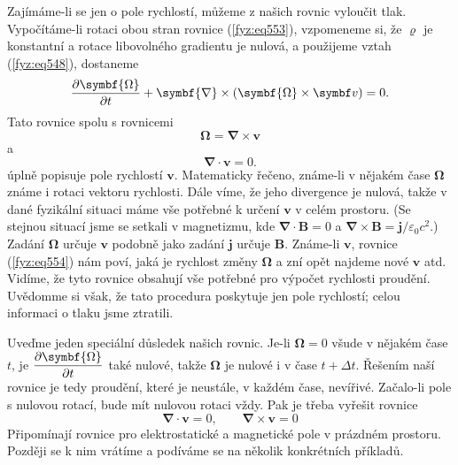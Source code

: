 {    Zajímáme-li se jen o pole rychlostí, můžeme z našich rovnic vyloučit tlak. Vypočítáme-li rotaci 
    obou stran rovnice (\ref{fyz:eq553}), vzpomeneme si, že \(\varrho\) je konstantní a rotace 
    libovolného gradientu je nulová, a použijeme vztah (\ref{fyz:eq548}), dostaneme
    \begin{equation}\label{fyz:eq554}
      \pder{\symbf{\Omega}}{t} + \symbf{\nabla}\times(\symbf{\Omega}\times\bm{v}) = 0.
    \end{equation}
    Tato rovnice spolu s rovnicemi
    \begin{equation}\label{fyz:eq555}
      \symbf{\Omega} = \symbf{\nabla}\times\bm{v}
    \end{equation}
    a
    \begin{equation}\label{fyz:eq556}
      \symbf{\nabla}\cdot\bm{v} = 0.
    \end{equation}
    úplně popisuje pole rychlostí \(\bm{v}\). Matematicky řečeno, známe-li v nějakém čase 
    \(\symbf{\Omega}\) známe i rotaci vektoru rychlosti. Dále víme, že jeho divergence je nulová, 
    takže v dané fyzikální situaci máme vše potřebné k určení \(\bm{v}\) v celém prostoru. (Se 
    stejnou situací jsme se setkali v magnetizmu, kde \(\symbf{\nabla}\cdot\bm{B}=0\) a 
    \(\symbf{\nabla}\times\bm{B}=\bm{j}/\varepsilon_0c^2\).) Zadání \(\symbf{\Omega}\) určuje 
    \(\bm{v}\) podobně jako zadání \(\bm{j}\) určuje \(\bm{B}\). Známe-li \(\bm{v}\), rovnice 
    (\ref{fyz:eq554}) nám poví, jaká je rychlost změny \(\symbf{\Omega}\) a zní opět najdeme nové 
    \(\bm{v}\) atd. Vidíme, že tyto rovnice obsahují vše potřebné pro výpočet rychlosti proudění. 
    Uvědomme si však, že tato procedura poskytuje jen pole rychlostí; celou informaci o tlaku jsme 
    ztratili. 
    
    Uveďme jeden speciální důsledek našich rovnic. Je-li \(\symbf{\Omega}=0\) všude v nějakém čase 
    \(t\), je \(\pder{\symbf{\Omega}}{t}\) také nulové, takže \(\symbf{\Omega}\) je nulové i v čase 
    \(t + \Delta t\). Řešením naší rovnice je tedy proudění, které je neustále, v každém čase, 
    nevířivé. Začalo-li pole s nulovou rotací, bude mít nulovou rotaci vždy. Pak je třeba vyřešit 
    rovnice
    \begin{equation*}
      \symbf{\nabla}\cdot\bm{v} = 0, \qquad \symbf{\nabla}\times\bm{v} = 0
    \end{equation*}
    Připomínají rovnice pro elektrostatické a magnetické pole v prázdném prostoru. Později se k nim 
    vrátíme a podíváme se na několik konkrétních příkladů.
    
}

